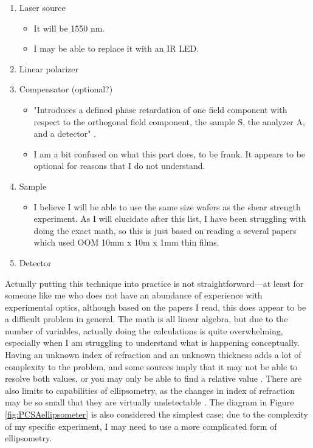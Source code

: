 \documentclass[colorlinks=true,pdfstartview=FitV,linkcolor=blue,
            citecolor=red,urlcolor=magenta]{ligodoc}
\begin{document}
\begin{enumerate}
    \item Laser source
        \begin{itemize}
        \item It will be 1550 nm.
        \item I may be able to replace it with an IR LED.
        \end{itemize}
    \item Linear polarizer
    \item Compensator (optional?)
        \begin{itemize}
        \item "Introduces a defined phase retardation of one field component with respect to the orthogonal field component, the sample S, the analyzer A, and a detector" \cite{Kurz}.
        \item I am a bit confused on what this part does, to be frank. It appears to be optional for reasons that I do not understand.
        \end{itemize}
    \item Sample
        \begin{itemize}
        \item I believe I will be able to use the same size wafers as the shear strength experiment. As I will elucidate after this list, I have been struggling with doing the exact math, so this is just based on reading a several papers which used OOM 10mm x 10m x 1mm thin films.
        \end{itemize}
    \item Detector
\end{enumerate}

Actually putting this technique into practice is not straightforward---at least for someone like me who does not have an abundance of experience with experimental optics, although based on the papers I read, this does appear to be a difficult problem in general. The math is all linear algebra, but due to the number of variables, actually doing the calculations is quite overwhelming, especially when I am struggling to understand what is happening conceptually. Having an unknown index of refraction and an unknown thickness adds a lot of complexity to the problem, and some sources imply that it may not be able to resolve both values, or you may only be able to find a relative value \cite{Zawada}. There are also limits to capabilities of ellipsometry, as the changes in index of refraction may be so small that they are virtually undetectable \cite{Kalkowski}. The diagram in Figure \ref{fig:PCSAellipsometer} is also considered the simplest case; due to the complexity of my specific experiment, I may need to use a more complicated form of ellipsometry.
\end{document}
